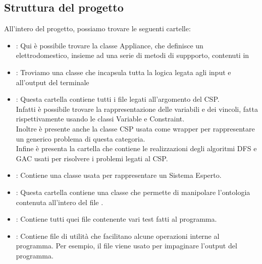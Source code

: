 \documentclass[12pt, letterpaper]{article}
\begin{document}
\subsection{Struttura del progetto}

All'intero del progetto, possiamo trovare le seguenti cartelle:
\begin{itemize}
    \item {}: Qui è possibile trovare la classe Appliance, che definisce
          un elettrodomestico, insieme ad una serie di metodi di suppporto,
          contenuti in 

    \item {}: Troviamo una classe che incapsula tutta la logica legata agli input
          e all'output del terminale

    \item {}: Questa cartella contiene tutti i file legati all'argomento del
          CSP. \\
          Infatti è possibile trovare la rappresentazione delle variabili e dei vincoli, fatta
          rispettivamente usando le classi Variable e Constraint. \\
          Inoltre è presente anche la classe CSP usata come wrapper per rappresentare un generico
          problema di questa categoria. \\
          Infine è presenta la cartella  che contiene le realizzazioni degli
          algoritmi DFS e GAC usati per risolvere i problemi legati al CSP.

    \item {}: Contiene una classe usata per rappresentare un Sistema Esperto.

    \item {}: Questa cartella contiene una classe che permette di manipolare
          l'ontologia contenuta all'intero del file .

    \item {}: Contiene tutti quei file contenente vari test fatti al programma.

    \item {}: Contiene file di utilità che facilitano alcune operazioni interne al programma.
          Per esempio, il file  viene usato per impaginare l'output del programma.
\end{itemize}
\end{document}
